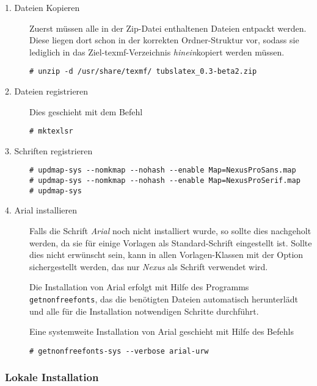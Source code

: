 \begin{description}
  \item[1. Dateien Kopieren] Zuerst müssen alle in der Zip-Datei enthaltenen
    Dateien entpackt werden.
    Diese liegen dort schon in der korrekten Ordner-Struktur vor, sodass
    sie lediglich in das Ziel-texmf-Verzeichnis \emph{hinein}kopiert werden
    müssen.
    \begin{lstlisting}[style=cmd]
# unzip -d /usr/share/texmf/ tubslatex_0.3-beta2.zip
    \end{lstlisting}

  \item[2. Dateien registrieren]
    Dies geschieht mit dem Befehl
    \begin{lstlisting}[style=cmd]
# mktexlsr
    \end{lstlisting}

  \item[3. Schriften registrieren]\hfill

    \begin{lstlisting}[style=cmd]
# updmap-sys --nomkmap --nohash --enable Map=NexusProSans.map
# updmap-sys --nomkmap --nohash --enable Map=NexusProSerif.map
# updmap-sys
    \end{lstlisting}
    
  \item[4. Arial installieren]
    Falls die Schrift \emph{Arial} noch nicht installiert wurde, so sollte dies
    nachgeholt werden, da sie für einige Vorlagen als Standard-Schrift
    eingestellt ist. Sollte dies nicht erwünscht sein, kann in allen
    Vorlagen-Klassen mit der Option  sichergestellt werden,
    das nur \emph{Nexus} als Schrift verwendet wird.
    
    Die Installation von Arial erfolgt mit Hilfe des Programms
    \lstinline{getnonfreefonts}, das die benötigten Dateien automatisch
    herunterlädt und alle für die Installation notwendigen Schritte durchführt.
    
    Eine systemweite Installation von Arial geschieht mit Hilfe des Befehls
    \begin{lstlisting}[style=cmd]
# getnonfreefonts-sys --verbose arial-urw
    \end{lstlisting}
    
\end{description}

\subsubsection{Lokale Installation}

